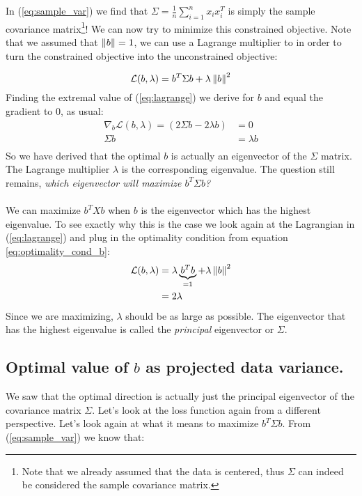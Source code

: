 In (\ref{eq:sample_var}) we find that $\Sigma = 
\frac{1}{n}\sum_{i=1}^{n} x_ix_i^T$ is simply the sample 
covariance matrix\footnote{Note that we already assumed that
the data is centered, thus $\Sigma$ can indeed be 
considered the sample covariance matrix.}!
We can now try to minimize this constrained objective.
Note that we assumed that $\left\lVert b\right\rVert=1$, 
we can use a Lagrange multiplier to in order to turn 
the constrained objective into the unconstrained objective:

\begin{equation}
\label{eq:lagrange}
\mathcal{L}(b,\lambda) = b^T\Sigma b + \lambda\left\lVert b\right\rVert^2	
\end{equation}
Finding the extremal value of (\ref{eq:lagrange}) we
derive for $b$ and equal the gradient to 0, as usual:
\begin{equation}
\label{eq:optimality_cond_b}
\begin{split}
\nabla_b\mathcal{L}(b,\lambda) = (2\Sigma b - 2\lambda b) &= 0\\
\Sigma b &= \lambda b\\
\end{split}			
\end{equation}
So we have derived that the optimal $b$ is actually 
an eigenvector of the $\Sigma$ matrix. The Lagrange 
multiplier $\lambda$ is the corresponding eigenvalue.
The question still remains, \textit{which eigenvector
will maximize $b^T\Sigma b$?}
\\\\
We can maximize $b^TXb$ when $b$ is the eigenvector
which has the highest eigenvalue. To see exactly why 
this is the case we look again at the Lagrangian in 
(\ref{eq:lagrange}) and plug in the optimality 
condition from equation \ref{eq:optimality_cond_b}:
\begin{equation}
\begin{split}
\mathcal{L}(b,\lambda) 
&= 
	\lambda \underbrace{b^Tb}_{=1} + 
	\lambda\left\lVert b\right\rVert^2 \\
&= 
	2\lambda \\
\end{split}
\end{equation}
Since we are maximizing, $\lambda$ should be as 
large as possible. The eigenvector that has the 
highest eigenvalue is called the \textit{principal} 
eigenvector or $\Sigma$.

\subsection{Optimal value of $b$ as projected data variance.}
We saw that the optimal direction is actually just 
the principal eigenvector of the covariance matrix $\Sigma$.
Let's look at the loss function again from a different
perspective. Let's look again at what it means to maximize 
$b^T\Sigma b$. From (\ref{eq:sample_var}) we know that:

